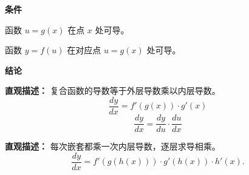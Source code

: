 \begin{statementbox}
	\textbf{\textcolor{CStatement}{条件}}
	\begin{description}[style=nextline, leftmargin=2.8em, labelsep=0.5em, itemsep=0.35em]
		\item[\textbf{\textcolor{CStatement}{条件1（内层可导）：}}] 函数 $u=g(x)$ 在点 $x$ 处可导。
		\item[\textbf{\textcolor{CStatement}{条件2（外层可导）：}}] 函数 $y=f(u)$ 在对应点 $u=g(x)$ 处可导。
	\end{description}

	\textbf{\textcolor{CStatement}{结论}}
	\begin{description}[style=nextline, leftmargin=2.8em, labelsep=0.5em, itemsep=0.45em]
		\item[\textbf{\textcolor{CStatement}{结论一（复合可导）：}}]
			\textbf{\textcolor{CStatement}{直观描述：}}
			复合函数的导数等于外层导数乘以内层导数。
			\[
				\frac{dy}{dx}=f'(g(x))\cdot g'(x)
			\]
			\[
				\frac{dy}{dx}=\frac{dy}{du}\cdot\frac{du}{dx}
			\]

		\item[\textbf{\textcolor{CStatement}{推广结论（多层嵌套）：}}]
			\textbf{\textcolor{CStatement}{直观描述：}}
			每次嵌套都乘一次内层导数，逐层求导相乘。
			\[
				\frac{dy}{dx}=f'(g(h(x)))\cdot g'(h(x))\cdot h'(x).
			\]
	\end{description}
\end{statementbox}
